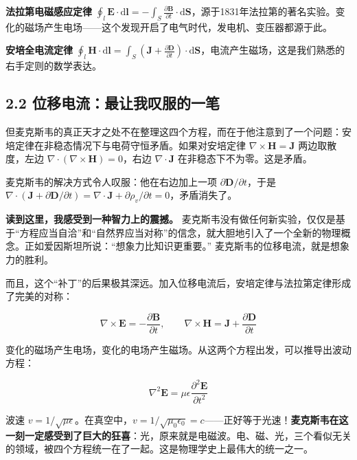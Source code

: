 \documentclass[12pt,a4paper]{ctexart}
\begin{document}
\textbf{法拉第电磁感应定律} $\oint_l \mathbf{E} \cdot \mathrm{d}\mathbf{l} = -\int_S \frac{\partial \mathbf{B}}{\partial t} \cdot \mathrm{d}\mathbf{S}$，源于1831年法拉第的著名实验。变化的磁场产生电场——这个发现开启了电气时代，发电机、变压器都源于此。

\textbf{安培全电流定律} $\oint_l \mathbf{H} \cdot \mathrm{d}\mathbf{l} = \int_S \left( \mathbf{J} + \frac{\partial \mathbf{D}}{\partial t} \right) \cdot \mathrm{d}\mathbf{S}$，电流产生磁场，这是我们熟悉的右手定则的数学表达。

\subsection*{2.2 位移电流：最让我叹服的一笔}

但麦克斯韦的真正天才之处不在整理这四个方程，而在于他注意到了一个问题：安培定律在非稳态情况下与电荷守恒矛盾。如果对安培定律 $\nabla \times \mathbf{H} = \mathbf{J}$ 两边取散度，左边 $\nabla \cdot (\nabla \times \mathbf{H}) = 0$，右边 $\nabla \cdot \mathbf{J}$ 在非稳态下不为零。这是矛盾。

麦克斯韦的解决方式令人叹服：他在右边加上一项 $\partial \mathbf{D}/\partial t$，于是 $\nabla \cdot (\mathbf{J} + \partial \mathbf{D}/\partial t) = \nabla \cdot \mathbf{J} + \partial \rho_v/\partial t = 0$，矛盾消失了。

\textbf{读到这里，我感受到一种智力上的震撼。} 麦克斯韦没有做任何新实验，仅仅是基于“方程应当自洽”和“自然界应当对称”的信念，就大胆地引入了一个全新的物理概念。正如爱因斯坦所说：“想象力比知识更重要。” 麦克斯韦的位移电流，就是想象力的胜利。

而且，这个“补丁”的后果极其深远。加入位移电流后，安培定律与法拉第定律形成了完美的对称：

\begin{equation}
\nabla \times \mathbf{E} = -\frac{\partial \mathbf{B}}{\partial t}, \qquad
\nabla \times \mathbf{H} = \mathbf{J} + \frac{\partial \mathbf{D}}{\partial t}
\end{equation}

变化的磁场产生电场，变化的电场产生磁场。从这两个方程出发，可以推导出波动方程：

\begin{equation}
\nabla^2 \mathbf{E} = \mu\epsilon \frac{\partial^2 \mathbf{E}}{\partial t^2}
\end{equation}

波速 $v = 1/\sqrt{\mu\epsilon}$。在真空中，$v = 1/\sqrt{\mu_0\epsilon_0} = c$——正好等于光速！\textbf{麦克斯韦在这一刻一定感受到了巨大的狂喜}：光，原来就是电磁波。电、磁、光，三个看似无关的领域，被四个方程统一在了一起。这是物理学史上最伟大的统一之一。
\end{document}

